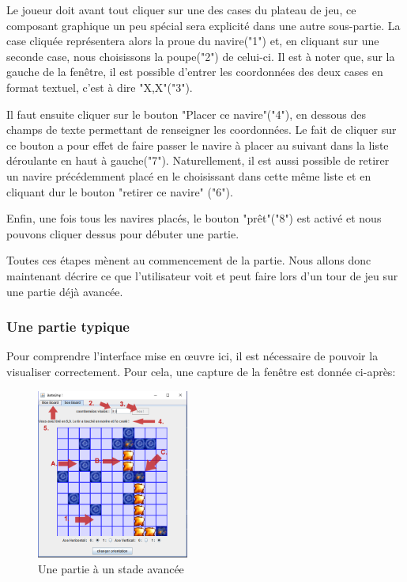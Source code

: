 	Le  joueur doit avant tout cliquer sur une des cases du plateau de jeu, ce composant graphique un peu spécial sera explicité dans une autre sous-partie. La case cliquée représentera alors la proue du navire("1") et, en cliquant sur une seconde case, nous choisissons la poupe("2") de celui-ci. Il est à noter que, sur la gauche de la fenêtre, il est possible d'entrer les coordonnées des deux cases en format textuel, c'est à dire "X,X"("3").
	\newline
	
	Il faut ensuite cliquer sur le bouton "Placer ce navire"("4"), en dessous des champs de texte permettant de renseigner les coordonnées. Le fait de cliquer sur ce bouton a pour effet de faire passer le navire à placer au suivant dans la liste déroulante en haut à gauche("7"). Naturellement, il est aussi possible de retirer un navire précédemment placé en le choisissant dans cette même liste et en cliquant dur le bouton "retirer ce navire" ("6").
	\newline
	
	Enfin, une fois tous les navires placés, le bouton "prêt"("8") est activé et nous pouvons cliquer dessus pour débuter une partie.
	\newline
	
	Toutes ces étapes mènent au commencement de la partie. Nous allons donc maintenant décrire ce que l'utilisateur voit et peut faire lors d'un tour de jeu sur une partie déjà avancée.
	
	\subsubsection{Une partie typique}
	Pour comprendre l'interface mise en œuvre ici, il est nécessaire de pouvoir la visualiser correctement. Pour cela, une capture de la fenêtre est donnée ci-après:\newline
	\begin{figure}[!ht]
		\centering
		\includegraphics [width=5cm]{images/game_in_action.png}
		\caption{Une partie à un stade avancée}
	\end{figure}
	
